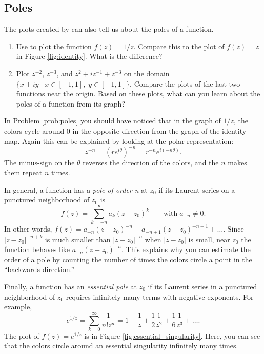 \subsection*{Poles}

The plots created by  can also tell us about the poles of a function.

\begin{problem}\label{prob:poles}
\leavevmode
\begin{enumerate}
\item Use  to plot the function $f(z) = 1/z$. 
Compare this to the plot of $f(z)=z$ in Figure \ref{fig:identity}.
What is the difference?
\item Plot $z^{-2}$, $z^{-3}$, and $z^2+iz^{-1}+z^{-3}$ on the domain $\{x+iy \mid x \in [-1,1] , \; y \in [-1,1]\}$. 
Compare the plots of the last two functions near the origin.
Based on these plots, what can you learn about the poles of a function from its graph?
\end{enumerate}
\end{problem}

In Problem \ref{prob:poles} you should have noticed that in the graph of $1/z$, the colors cycle around 0 in the opposite direction from the graph of the identity map.
Again this can be explained by looking at the polar representation:
\[
z^{-n} = (re^{i \theta})^{-n} = r^{-n} e^{i(-n\theta)}.
\]
The minus-sign on the $\theta$ reverses the direction of the colors, and the $n$ makes them repeat $n$ times.

In general, a function has a \emph{pole of order n} at $z_0$ if its Laurent series on a punctured neighborhood of $z_0$ is
\[
f(z) = \sum_{k=-n}^\infty a_k(z-z_0)^k  \qquad \text{with} \; a_{-n} \neq 0.
\]
In other words, $f(z) = a_{-n}(z-z_0)^{-n}+a_{-n+1}(z-z_0)^{-n+1} + \ldots$.
Since $|z-z_0|^{-n+k}$ is much smaller than $|z-z_0|^{-n}$ when $|z-z_0|$ is small, near $z_0$ the function behaves like $a_{-n}(z-z_0)^{-n}$.
This explains why you can estimate the order of a pole by counting the number of times the colors circle a point in the ``backwards direction.''

Finally, a function has an \emph{essential pole} at $z_0$ if its Laurent series in a punctured neighborhood of $z_0$ requires infinitely many terms with negative exponents.
For example, 
\[
e^{1/z} = \sum_{k=0}^{\infty}\frac{1}{n! z^n} = 1+\frac{1}{z}+\frac{1}{2}\frac{1}{z^2}+\frac{1}{6}\frac{1}{z^3}+\ldots.
\]
The plot of $f(z) = e^{1/z}$ is in Figure \ref{fig:essential_singularity}. 
Here, you can see that the colors circle around an essential singularity infinitely many times.

